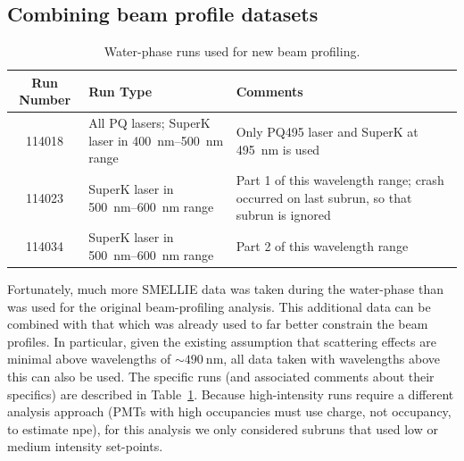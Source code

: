 \subsection{Combining beam profile datasets}
    \begin{table}
        \begin{tabular}{c p{6cm} p{6cm}}
            \hline
            Run Number & Run Type & Comments \\ \hline \hline
            \num{114018} & All PQ lasers; SuperK laser in \SIrange{400}{500}{\nano\metre} range & Only PQ495 laser and SuperK at \SI{495}{\nano\metre} is used \\
            \num{114023} & SuperK laser in \SIrange{500}{600}{\nano\metre} range & Part 1 of this wavelength range; crash occurred on last subrun, so that subrun is ignored \\
            \num{114034} & SuperK laser in \SIrange{500}{600}{\nano\metre} range & Part 2 of this wavelength range \\
            \hline
        \end{tabular}
        \caption{Water-phase runs used for new beam profiling.}
        \label{tab:runs_used}
    \end{table}
Fortunately, much more SMELLIE data was taken during the water-phase than was used for the original beam-profiling analysis. This additional data can be combined with that which was already used to far better constrain the beam profiles. In particular, given the existing assumption that scattering effects are minimal above wavelengths of $\sim\SI{490}{\nano\metre}$, all data taken with wavelengths above this can also be used. The specific runs (and associated comments about their specifics) are described in Table~\ref{tab:runs_used}. Because high-intensity runs require a different analysis approach (PMTs with high occupancies must use charge, not occupancy, to  estimate npe), for this analysis we only considered subruns that used low or medium intensity set-points.

